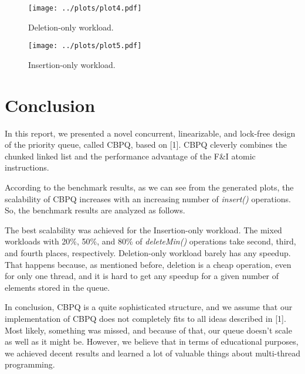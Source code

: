 \documentclass{article}
\begin{document}
  \begin{figure}[H]
    \centering
    \texttt{[image: ../plots/plot4.pdf]}
    \caption{Deletion-only workload.}
    \label{fig:plot4}
  \end{figure}

  \begin{figure}[H]
    \centering
    \texttt{[image: ../plots/plot5.pdf]}
    \caption{Insertion-only workload.}
    \label{fig:plot5}
  \end{figure}

  \section{Conclusion}
  In this report, we presented a novel concurrent, linearizable, and lock-free design of the priority queue, called CBPQ, based on [1]. CBPQ cleverly combines the chunked linked list and the performance advantage of the F\&I atomic instructions.\par
  According to the benchmark results, as we can see from the generated plots, the scalability of CBPQ increases with an increasing number of \textit{insert()} operations. So, the benchmark results are analyzed as follows.\par

  The best scalability was achieved for the Insertion-only workload. The mixed workloads with 20\%, 50\%, and 80\% of \textit{deleteMin()} operations take second, third, and fourth places, respectively. Deletion-only workload barely has any speedup. That happens because, as mentioned before, deletion is a cheap operation, even for only one thread, and it is hard to get any speedup for a given number of elements stored in the queue.\par

  In conclusion, CBPQ is a quite sophisticated structure, and we assume that our implementation of CBPQ does not completely fits to all ideas described in [1]. Most likely, something was missed, and because of that, our queue doesn't scale as well as it might be. However, we believe that in terms of educational purposes, we achieved decent results and learned a lot of valuable things about multi-thread programming.

  \pagebreak
\end{document}
